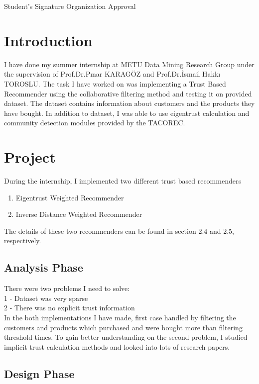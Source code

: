 \documentclass[12pt]{article}
\begin{document}
\begin{titlepage}
Student's Signature \hspace{150px} Organization Approval \\


\end{titlepage}


\tableofcontents          
\newpage

\section{Introduction}
I have done my summer internship at METU Data Mining Research Group under the supervision of Prof.Dr.Pınar KARAGÖZ and Prof.Dr.İsmail Hakkı TOROSLU. The task I have worked on was implementing a Trust Based Recommender using the collaborative filtering method and testing it on provided dataset. The dataset contains information about customers and the products they have bought. In addition to dataset, I was able to use eigentrust calculation and community detection modules provided by the TACOREC.

\section{Project}
During the internship, I implemented two different trust based recommenders
\begin{enumerate}
\item Eigentrust Weighted Recommender
\item Inverse Distance Weighted Recommender
\end{enumerate} 
The details of these two recommenders can be found in section 2.4 and 2.5, respectively.

\subsection{Analysis Phase}
There were two problems I need to solve: \\
1 - Dataset was very sparse \\ 
2 - There was no explicit trust information \\
In the both implementations I have made, first case handled by filtering the customers and products which purchased and were bought more than filtering threshold times. To gain better understanding on the second problem, I studied implicit trust calculation methods and looked into lots of research papers.

\subsection{Design Phase}
\end{document}
